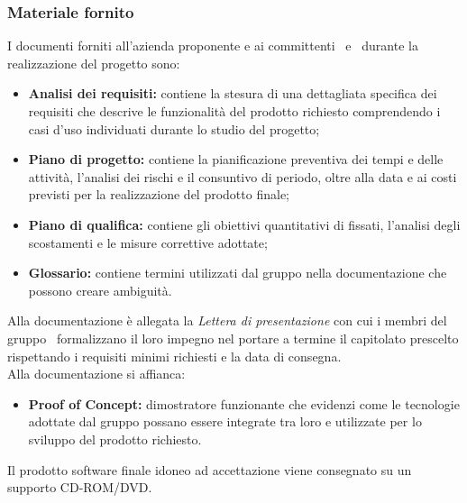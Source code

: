 \subsubsection{Materiale fornito}\label{MaterialeFornito} 
I documenti forniti all'azienda proponente e ai committenti \VT\ e \CR\ durante la realizzazione del progetto sono:
\begin{itemize}
	\item \textbf{Analisi dei requisiti:} contiene la stesura di una dettagliata specifica dei requisiti che descrive le funzionalità del prodotto richiesto comprendendo i casi d'uso individuati durante lo studio del progetto;
	\item \textbf{Piano di progetto:} contiene la pianificazione preventiva dei tempi e delle attività, l’analisi dei rischi e il consuntivo di periodo, oltre alla data e ai costi previsti per la realizzazione del prodotto finale;
	\item \textbf{Piano di qualifica:} contiene gli obiettivi quantitativi di  fissati, l'analisi degli scostamenti e le misure correttive adottate;
	\item \textbf{Glossario:} contiene termini utilizzati dal gruppo nella documentazione che possono creare ambiguità.
\end{itemize}
Alla documentazione è allegata la \textit{Lettera di presentazione} con cui i membri del gruppo \Gruppo\ formalizzano il loro impegno nel portare a termine il capitolato prescelto rispettando i requisiti minimi richiesti e la data di consegna.\\
Alla documentazione si affianca:
\begin{itemize}
	\item \textbf{Proof of Concept:} dimostratore funzionante che evidenzi come le tecnologie adottate dal gruppo possano essere integrate tra loro e utilizzate per lo sviluppo del prodotto richiesto.
\end{itemize}
Il prodotto software finale idoneo ad accettazione viene consegnato su un supporto CD-ROM/DVD.

